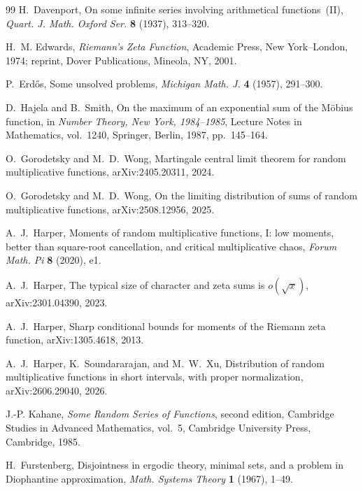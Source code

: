\documentclass[11pt]{article}
\theoremstyle{remark}
\begin{document}
\begin{thebibliography}{99}
H.~Davenport,
\newblock On some infinite series involving arithmetical functions~(II),
\newblock \emph{Quart. J. Math. Oxford Ser.}
\textbf{8} (1937), 313--320.

H.~M. Edwards,
\newblock \emph{Riemann's Zeta Function},
\newblock Academic Press, New York--London, 1974;
reprint, Dover Publications, Mineola, NY, 2001.

P.~Erd\H{o}s,
\newblock Some unsolved problems,
\newblock \emph{Michigan Math. J.}
\textbf{4} (1957), 291--300.

D.~Hajela and B.~Smith,
\newblock On the maximum of an exponential sum of the M\"obius function,
\newblock in \emph{Number Theory, New York, 1984--1985},
Lecture Notes in Mathematics, vol.~1240,
Springer, Berlin, 1987, pp.~145--164.

O.~Gorodetsky and M.~D.~Wong,
Martingale central limit theorem for random multiplicative functions,
arXiv:2405.20311, 2024.

O.~Gorodetsky and M.~D.~Wong,
On the limiting distribution of sums of random multiplicative functions,
arXiv:2508.12956, 2025.

A.~J.~Harper,
Moments of random multiplicative functions, I: low moments, better than
square-root cancellation, and critical multiplicative chaos,
\emph{Forum Math. Pi} \textbf{8} (2020), e1.

A.~J.~Harper,
The typical size of character and zeta sums is \(o(\sqrt{x})\),
arXiv:2301.04390, 2023.

A.~J.~Harper,
Sharp conditional bounds for moments of the Riemann zeta function,
arXiv:1305.4618, 2013.

A.~J.~Harper, K.~Soundararajan, and M.~W.~Xu,
Distribution of random multiplicative functions in short intervals,
with proper normalization,
arXiv:2606.29040, 2026.

J.-P. Kahane,
\newblock \emph{Some Random Series of Functions},
\newblock second edition, Cambridge Studies in Advanced Mathematics,
vol.~5, Cambridge University Press, Cambridge, 1985.

H.~Furstenberg,
\newblock Disjointness in ergodic theory, minimal sets, and a problem in
Diophantine approximation,
\newblock \emph{Math. Systems Theory} \textbf{1} (1967), 1--49.


\end{thebibliography}
\end{document}
